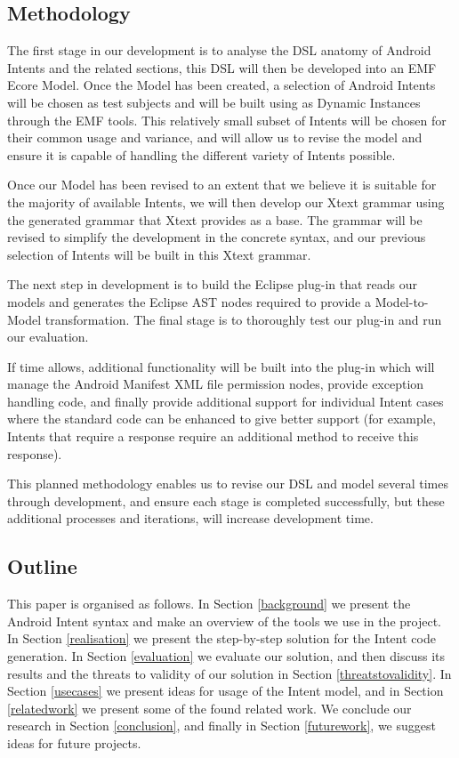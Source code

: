 \subsection{Methodology}
The first stage in our development is to analyse the DSL anatomy of Android Intents and the related sections, this DSL will then be developed into an EMF Ecore Model. Once the Model has been created, a selection of Android Intents will be chosen as test subjects and will be built using as Dynamic Instances through the EMF tools. This relatively small subset of Intents will be chosen for their common usage and variance, and will allow us to revise the model and ensure it is capable of handling the different variety of Intents possible.

Once our Model has been revised to an extent that we believe it is suitable for the majority of available Intents, we will then develop our Xtext grammar using the generated grammar that Xtext provides as a base. The grammar will be revised to simplify the development in the concrete syntax, and our previous selection of Intents will be built in this Xtext grammar.

The next step in development is to build the Eclipse plug-in that reads our models and generates the Eclipse AST nodes required to provide a Model-to-Model transformation. The final stage is to thoroughly test our plug-in and run our evaluation.

If time allows, additional functionality will be built into the plug-in which will manage the Android Manifest XML file permission nodes, provide exception handling code, and finally provide additional support for individual Intent cases where the standard code can be enhanced to give better support (for example, Intents that require a response require an additional method to receive this response).

This planned methodology enables us to revise our DSL and model several times through development, and ensure each stage is completed successfully, but these additional processes and iterations, will increase development time.

\subsection{Outline}
This paper is organised as follows. In Section \ref{background} we present the Android Intent syntax and make an overview of the tools we use in the project. In Section \ref{realisation} we present the step-by-step solution for the Intent code generation. In Section \ref{evaluation} we evaluate our solution, and then discuss its results and the threats to validity of our solution in Section \ref{threatstovalidity}. In Section \ref{usecases} we present ideas for usage of the Intent model, and in Section \ref{relatedwork} we present some of the found related work. We conclude our research in Section \ref{conclusion}, and finally in Section \ref{futurework}, we suggest ideas for future projects.